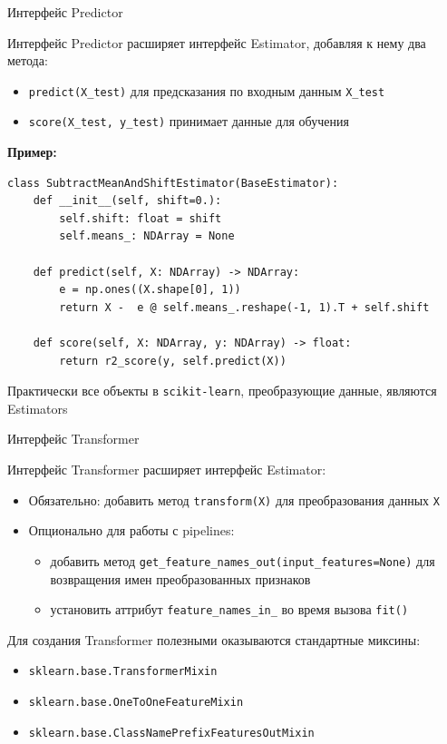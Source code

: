\documentclass{beamer}
\begin{document}
\begin{frame}[fragile]{Интерфейс Predictor}
    \scriptsize

    Интерфейс Predictor расширяет интерфейс Estimator, добавляя к нему два метода:
    \begin{itemize}
        \item \texttt{predict(X\_test)} для предсказания по входным данным \texttt{X\_test}
        \item \texttt{score(X\_test, y\_test)} принимает данные для обучения
    \end{itemize}

    \textbf{Пример:}
    \begin{lstlisting}
class SubtractMeanAndShiftEstimator(BaseEstimator):
    def __init__(self, shift=0.):
        self.shift: float = shift
        self.means_: NDArray = None

    def predict(self, X: NDArray) -> NDArray:
        e = np.ones((X.shape[0], 1))
        return X -  e @ self.means_.reshape(-1, 1).T + self.shift

    def score(self, X: NDArray, y: NDArray) -> float:
        return r2_score(y, self.predict(X))\end{lstlisting}

    Практически все объекты в \texttt{scikit-learn}, преобразующие данные, являются Estimators
\end{frame}

\begin{frame}{Интерфейс Transformer}
    \small

    Интерфейс Transformer расширяет интерфейс Estimator:
    \begin{itemize}
        \item Обязательно: добавить метод \texttt{transform(X)} для преобразования данных \texttt{X}
        \item Опционально для работы с pipelines:
        \begin{itemize}
            \scriptsize
            \item добавить метод \texttt{get\_feature\_names\_out(input\_features=None)} для возвращения имен преобразованных признаков
            \item установить аттрибут \texttt{feature\_names\_in\_} во время вызова \texttt{fit()}
        \end{itemize}
    \end{itemize}

    Для создания Transformer полезными оказываются стандартные миксины:
    \begin{itemize}
        \item \texttt{sklearn.base.TransformerMixin}
        \item \texttt{sklearn.base.OneToOneFeatureMixin}
        \item \texttt{sklearn.base.ClassNamePrefixFeaturesOutMixin}
    \end{itemize}
\end{frame}
\end{document}
